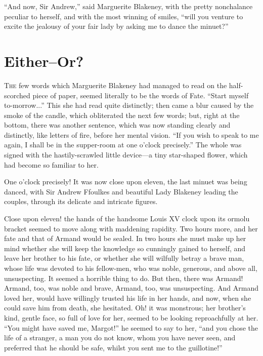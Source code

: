 \documentclass[paper=a5,BCOR=7mm,twoside,DIV=calc,12pt,usegeometry,chapterprefix,endperiod,headings=big]{scrbook}
\begin{document}
\enquote{And now, Sir Andrew,} said Marguerite Blakeney, with the pretty nonchalance peculiar to herself, and with the most winning of smiles, \enquote{will you venture to excite the jealousy of your fair lady by asking me to dance the minuet?}

\chapter[Either---Or?]{Either–Or?}
\lettrine[lines=4]{T}{he} few words which Marguerite Blakeney had managed to read on the half-scorched piece of paper, seemed literally to be the words of Fate. \enquote{Start myself to-morrow...} This she had read quite distinctly; then came a blur caused by the smoke of the candle, which obliterated the next few words; but, right at the bottom, there was another sentence, which was now standing clearly and distinctly, like letters of fire, before her mental vision. \enquote{If you wish to speak to me again, I shall be in the supper-room at one o'clock precisely.} The whole was signed with the hastily-scrawled little device---a tiny star-shaped flower, which had become so familiar to her.

One o'clock precisely! It was now close upon eleven, the last minuet was being danced, with Sir Andrew Ffoulkes and beautiful Lady Blakeney leading the couples, through its delicate and intricate figures.

Close upon eleven! the hands of the handsome Louis XV clock upon its ormolu bracket seemed to move along with maddening rapidity. Two hours more, and her fate and that of Armand would be sealed. In two hours she must make up her mind whether she will keep the knowledge so cunningly gained to herself, and leave her brother to his fate, or whether she will wilfully betray a brave man, whose life was devoted to his fellow-men, who was noble, generous, and above all, unsuspecting. It seemed a horrible thing to do. But then, there was Armand! Armand, too, was noble and brave, Armand, too, was unsuspecting. And Armand loved her, would have willingly trusted his life in her hands, and now, when she could save him from death, she hesitated. Oh! it was monstrous; her brother's kind, gentle face, so full of love for her, seemed to be looking reproachfully at her. \enquote{You might have saved me, Margot!} he seemed to say to her, \enquote{and you chose the life of a stranger, a man you do not know, whom you have never seen, and preferred that he should be safe, whilst you sent me to the guillotine!}
\end{document}
